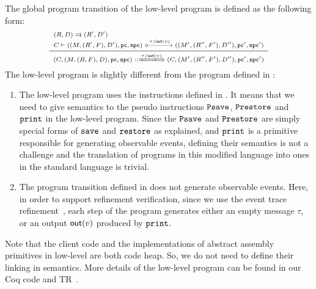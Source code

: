 The global program transition of the low-level \sparc{} program is defined
as the following form:
\[
    \scriptsize
    \infer
    {
        \LGlobTrans{(\code, (\Mem, (\RFile, \Wstack), \DBuf), \pc, \npc)}
            { \empmsg / \outEvt{\val} }
            {(\code, (\Mem', (\RFile'', \Wstack'), \DBuf''), \pc', \npc')}
    }
    {
        \begin{array}{l}
            \Dstep{(\RFile, \DBuf)}{(\RFile', \DBuf')} \\
            \llocalstep{\code}
                {((\Mem, (\RFile', \Wstack), \DBuf'), \pc, \npc)}
                { \empmsg / \outEvt{\val} }
                {((\Mem', (\RFile'', \Wstack'), \DBuf''), \pc', \npc')}
        \end{array}
    }
\]
The low-level \sparc{} program is slightly different
from the \sparc{} program defined in
\Sec{\ref{sec:modeling}}:
\begin{enumerate}
    \item The low-level \sparc{} program uses the
        instructions defined in
        \Fig{\ref{fig:syntax-of-concur-pseudo-sparc}}.
        It means that we need to give semantics to the %
        pseudo instructions $\texttt{Psave}$, $\texttt{Prestore}$ and
        $\texttt{print}$ in the low-level \sparc{} program.
        Since the $\texttt{Psave}$ and $\texttt{Prestore}$
        are simply special forms of $\texttt{save}{}$ and
        $\texttt{restore}{}$ as explained,
        and $\texttt{print}$ is a primitive
        responsible for generating observable events,
        defining their semantics is not a challenge
        and the translation of programs in this modified language 
        into ones in the standard \sparc{} language is 
        trivial.
    \item The program transition defined in
        \Sec{\ref{sec:modeling}} does not generate
        observable events. Here, in order to support
        refinement verification, since
        we use the event trace refinement~\cite{liang14lics},
        each step of the program
        generates either an empty message $\tau$,
        or an output $\textsf{out}({v})$ produced
        by $\texttt{print}$.
\end{enumerate}

Note that the client
code and the implementations of abstract assembly primitives
in low-level are both \sparc{} code heap. So, we do not need
to define their linking in semantics.
More details of the low-level program can be found in
our Coq code 
and TR~\cite{coqimp}.

